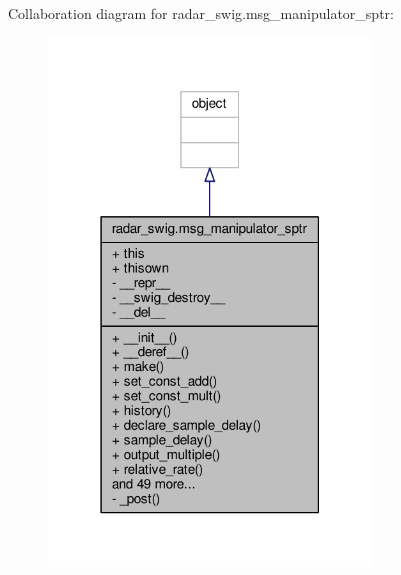 Collaboration diagram for radar\+\_\+swig.\+msg\+\_\+manipulator\+\_\+sptr\+:
\nopagebreak
\begin{figure}[H]
\begin{center}
\leavevmode
\includegraphics[width=243pt]{d1/da9/classradar__swig_1_1msg__manipulator__sptr__coll__graph}
\end{center}
\end{figure}

